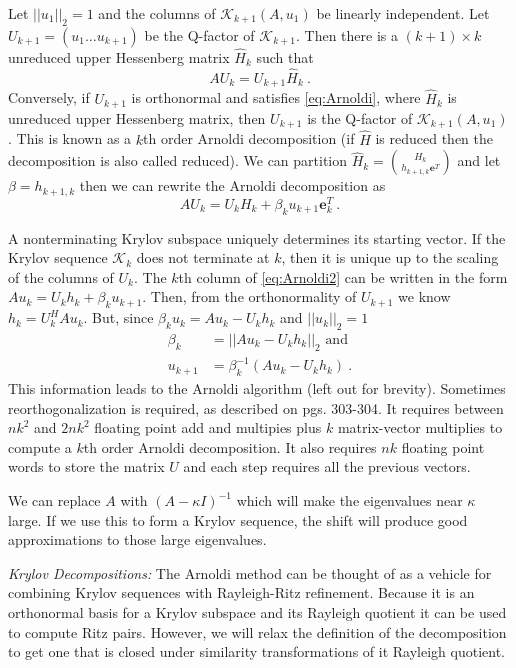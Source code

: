 \documentclass[12pt,twoside]{article}
\newcommand{\evalsl}{eigenvalues}
\newcommand{\evals}{eigenvalues }
\newcommand{\cl}[1]{\ensuremath{\mathcal{#1}}}
\newcommand{\ve}[1]{\ensuremath{\mathbf{#1}}}
\begin{document}
Let $||u_1||_2 = 1$ and the columns of $\cl{K}_{k+1}(A,u_1)$ be linearly independent. Let $U_{k+1} = (u_1 \dots u_{k+1})$ be the Q-factor of $\cl{K}_{k+1}$. Then there is a $(k+1) \times k$ unreduced upper Hessenberg matrix $\hat{H}_k$ such that 
\begin{equation}
  AU_k = U_{k+1}\hat{H}_k \:.
  \label{eq:Arnoldi}
\end{equation}
Conversely, if $U_{k+1}$ is orthonormal and satisfies \eqref{eq:Arnoldi}, where $\hat{H}_k$ is unreduced upper Hessenberg matrix, then $U_{k+1}$ is the Q-factor of $\cl{K}_{k+1}(A,u_1)$. This is known as a $k$th order Arnoldi decomposition (if $\hat{H}$ is reduced then the decomposition is also called reduced). We can partition $\hat{H}_k = \binom{H_k}{h_{k+1,k}\ve{e}^T}$ and let $\beta = h_{k+1,k}$ then we can rewrite the Arnoldi decomposition as
\begin{equation}
  AU_k = U_kH_k + \beta_ku_{k+1}\ve{e}_k^T \:.
  \label{eq:Arnoldi2}
\end{equation}

A nonterminating Krylov subspace uniquely determines its starting vector. If the Krylov sequence $\cl{K}_k$ does not terminate at $k$, then it is unique up to the scaling of the columns of $U_k$. The $k$th column of \eqref{eq:Arnoldi2} can be written in the form $Au_k = U_kh_k + \beta_ku_{k+1}$. Then, from the orthonormality of $U_{k+1}$ we know $h_k = U_k^HAu_k$. But, since $\beta_ku_k = Au_k - U_kh_k$ and $||u_k||_2 = 1$
\begin{align}
  \beta_k &= ||Au_k - U_kh_k||_2 \text{ and} \\
  u_{k+1} &= \beta_k^{-1}(Au_k - U_kh_k) \:.
\end{align}
This information leads to the Arnoldi algorithm (left out for brevity). Sometimes reorthogonalization is required, as described on pgs. 303-304. It requires between $nk^2$ and $2nk^2$ floating point add and multipies plus $k$ matrix-vector multiplies to compute a $k$th order Arnoldi decomposition. It also requires $nk$ floating point words to store the matrix $U$ and each step requires all the previous vectors. 

We can replace $A$ with $(A - \kappa I)^{-1}$ which will make the \evals near $\kappa$ large. If we use this to form a Krylov sequence, the shift will produce good approximations to those large \evalsl. 

\emph{Krylov Decompositions:} The Arnoldi method can be thought of as a vehicle for combining Krylov sequences with Rayleigh-Ritz refinement. Because it is an orthonormal basis for a Krylov subspace and its Rayleigh quotient it can be used to compute Ritz pairs. However, we will relax the definition of the decomposition to get one that is closed under similarity transformations of it Rayleigh quotient. 
\end{document}
